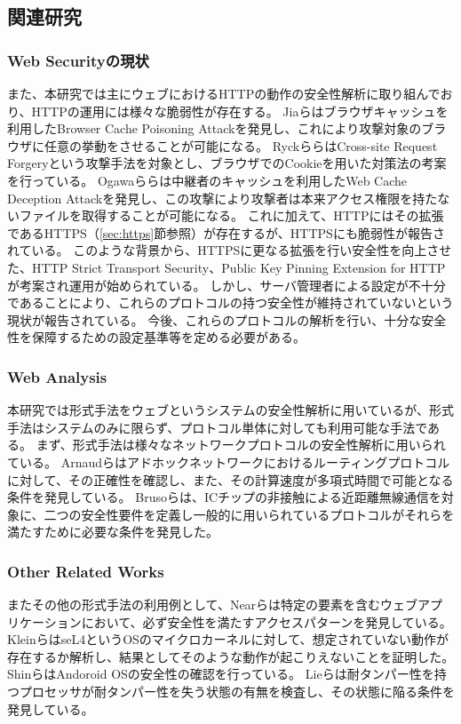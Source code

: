 \documentclass[journal]{IEEEtran}
\begin{document}
\subsection{関連研究}
\subsubsection{Web Securityの現状}
また、本研究では主にウェブにおけるHTTPの動作の安全性解析に取り組んでおり、HTTPの運用には様々な脆弱性が存在する。
Jiaら\cite{bcpattack}はブラウザキャッシュを利用したBrowser Cache Poisoning Attackを発見し、これにより攻撃対象のブラウザに任意の挙動をさせることが可能になる。
Ryckら\cite{cookie-model}らはCross-site Request Forgeryという攻撃手法を対象とし、ブラウザでのCookieを用いた対策法の考案を行っている。
Ogawaら\cite{WCD}らは中継者のキャッシュを利用したWeb Cache Deception Attackを発見し、この攻撃により攻撃者は本来アクセス権限を持たないファイルを取得することが可能になる。
これに加えて、HTTPにはその拡張であるHTTPS（\ref{sec:https}節参照）が存在するが、HTTPSにも脆弱性が報告されている\cite{poodle}。
このような背景から、HTTPSに更なる拡張を行い安全性を向上させた、HTTP Strict Transport Security\cite{hsts}、Public Key Pinning Extension for HTTP\cite{hpkp}が考案され運用が始められている。
しかし、サーバ管理者による設定が不十分であることにより、これらのプロトコルの持つ安全性が維持されていないという現状が報告されている\cite{hstshpkp}。
今後、これらのプロトコルの解析を行い、十分な安全性を保障するための設定基準等を定める必要がある。

\subsubsection{Web Analysis}
本研究では形式手法をウェブというシステムの安全性解析に用いているが、形式手法はシステムのみに限らず、プロトコル単体に対しても利用可能な手法である。
まず、形式手法は様々なネットワークプロトコルの安全性解析に用いられている。
Arnaudら\cite{modeling-and-verifying-ad-hoc}はアドホックネットワークにおけるルーティングプロトコルに対して、その正確性を確認し、また、その計算速度が多項式時間で可能となる条件を発見している。
Brusoら\cite{formal-verification-of-privacy-for}は、ICチップの非接触による近距離無線通信\cite{formal-verification-of-privacy-for}を対象に、二つの安全性要件を定義し一般的に用いられているプロトコルがそれらを満たすために必要な条件を発見した。

\subsubsection{Other Related Works}
またその他の形式手法の利用例として、Nearら\cite{finding_security_bugs_in_web}は特定の要素を含むウェブアプリケーションにおいて、必ず安全性を満たすアクセスパターンを発見している。
Kleinら\cite{sel4_formal_verification_of_an}はseL4というOSのマイクロカーネルに対して、想定されていない動作が存在するか解析し、結果としてそのような動作が起こりえないことを証明した。
Shinら\cite{towards_formal_analysis_of_the}はAndoroid OSの安全性の確認を行っている。
Lieら\cite{specifying_and_verifying_hardware_for_tamper}は耐タンパー性を持つプロセッサが耐タンパー性を失う状態の有無を検査し、その状態に陥る条件を発見している。
\end{document}
